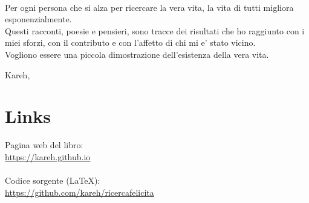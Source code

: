 \leavevmode\\
Per ogni persona che si alza per ricercare la vera vita,
la vita di tutti migliora esponenzialmente.\\

Questi racconti, poesie e pensieri, sono tracce dei risultati che ho raggiunto con i miei sforzi, con il contributo e con l'affetto di chi mi e' stato vicino.\\
Vogliono essere una piccola dimostrazione dell'esistenza della vera vita.

\begin{flushright}
    \vspace*{\fill}
    Kareh, \finishDate
\end{flushright}


\section{Links}

Pagina web del libro:\\
\url{https://kareh.github.io}\\

\leavevmode\\
Codice sorgente (LaTeX):\\
\url{https://github.com/kareh/ricercafelicita}

